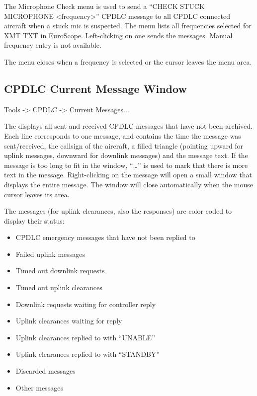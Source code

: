 \documentclass[a4paper,oneside,11pt]{memoir}
\begin{document}
\bigskip


The Microphone Check menu is used to send a “CHECK STUCK MICROPHONE <frequency>” CPDLC message to all CPDLC connected aircraft when a stuck mic is suspected. The menu lists all frequencies selected for XMT TXT in EuroScope. Left-clicking on one sends the messages. Manual frequency entry is not available.

\bigskip

The menu closes when a frequency is selected or the cursor leaves the menu area.

\subsection{CPDLC Current Message Window}
\label{win:dlcmw}

 Tools -> CPDLC -> Current Messages...

\bigskip


The  displays all sent and received CPDLC messages that have not been archived. Each line corresponds to one message, and contains the time the message was sent/received, the callsign of the aircraft, a filled triangle (pointing upward for uplink messages, downward for downlink messages) and the message text. If the message is too long to fit in the window, “…” is used to mark that there is more text in the message. Right-clicking on the message will open a small window that displays the entire message. The window will close automatically when the mouse cursor leaves its area.

\bigskip

The messages (for uplink clearances, also the responses) are color coded to display their status:

\begin{itemize}
    \item {} CPDLC emergency messages that have not been replied to
    \item {} Failed uplink messages
    \item {} Timed out downlink requests
    \item {} Timed out uplink clearances
    \item {} Downlink requests waiting for controller reply
    \item {} Uplink clearances waiting for reply
    \item {} Uplink clearances replied to with “UNABLE”
    \item {} Uplink clearances replied to with “STANDBY”    
    \item {} Discarded messages
    \item {} Other messages
\end{itemize}
\end{document}
